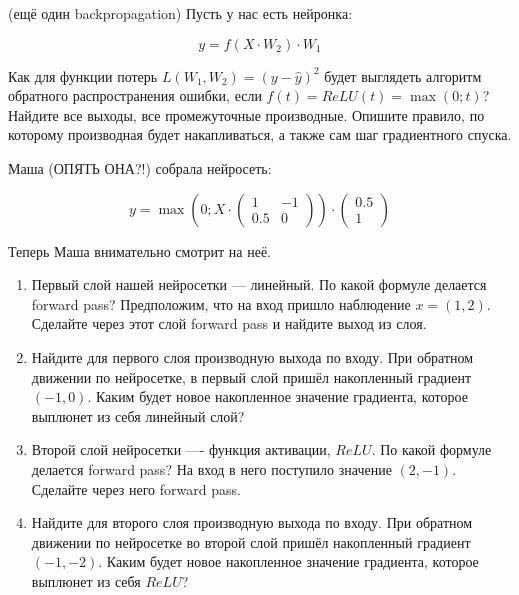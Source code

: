 \documentclass[12pt, a4paper, oneside]{article}
\theoremstyle{plain} %
\theoremstyle{definition}
\begin{document}
\begin{problem}{(ещё один backpropagation)}
	Пусть у нас есть нейронка: 
	
	$$ 
	y = f(X \cdot W_2 ) \cdot W_1 
	$$
	
	Как для функции потерь $L(W_1, W_2) = (y - \hat y)^2$ будет выглядеть алгоритм обратного распространения ошибки, если $f(t) = ReLU(t) =  \max(0; t)$? Найдите все выходы, все промежуточные производные.  Опишите правило, по которому производная будет накапливаться, а также сам шаг градиентного спуска. 
\end{problem} 


\begin{problem}
	Маша (ОПЯТЬ ОНА?!) собрала нейросеть: 
	
	\begin{equation*}
	y =   \max \left( 0;  X \cdot  \begin{pmatrix} 1 & -1 \\ 0.5 & 0 \end{pmatrix} \right) \cdot \begin{pmatrix} 0.5 \\ 1 \end{pmatrix} 
	\end{equation*}

	Теперь Маша внимательно смотрит на неё.
	
	\begin{enumerate}
		\item  Первый слой нашей нейросетки --- линейный. По какой формуле делается forward pass? Предположим, что на вход пришло наблюдение $x = (1, 2)$. Сделайте через этот слой forward pass и найдите выход из слоя.
		
		\item Найдите для первого слоя производную выхода по входу. При обратном движении по нейросетке, в первый слой пришёл накопленный градиент $(-1, 0)$. Каким будет новое накопленное значение градиента, которое выплюнет из себя линейный слой? 
		
		\item Второй слой нейросетки ---- функция активации, $ReLU.$  По какой формуле делается forward pass? На вход в него поступило значение $(2, -1)$. Сделайте через него forward pass. 
		
		\item Найдите для второго слоя производную выхода по входу. При обратном движении по нейросетке во второй слой пришёл накопленный градиент $(-1, -2)$.  Каким будет новое накопленное значение градиента, которое выплюнет из себя $ReLU$? 
		

\end{enumerate}
\end{problem}
\end{document}

